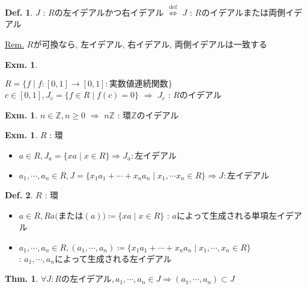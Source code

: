 \documentclass[uplatex,dvipdfmx,9pt]{beamer}
\newcommand{\defarrow}{\overset{\mathrm{def}}{\Leftrightarrow}}
\newcounter{textExmCount}
\theoremstyle{definition} %
\newtheorem{defn}{Def.}[subsection] %
\newtheorem{thm}{Thm.}[subsection] %
\theoremstyle{example}
\newtheorem{exmText}[textExmCount]{Exm.}
\begin{document}
    \begin{frame}

      \begin{defn}
        $J$ : $R$の左イデアルかつ右イデアル $\defarrow$ $J$ : $R$の\alert{イデアル}または\alert{両側イデアル}
      \end{defn}
      \underline{Rem.} $R$が可換なら, 左イデアル, 右イデアル, 両側イデアルは一致する
 
      \begin{exmText}
        \hypertarget{exmText3-1}{}
        $R = \{f \mid f\colon [0,1] \to [0,1] : \text{実数値連続関数}\}$ \\
        $c \in [0,1], J_c = \{f \in R \mid f(c) = 0\}$ $\Rightarrow$ $J_c$ : $R$のイデアル
      \end{exmText}

      \begin{exmText}
        $n \in \mathbb{Z}, n \ge 0$ $\Rightarrow$ $n\mathbb{Z}$ : 環$\mathbb{Z}$のイデアル
      \end{exmText}

    \end{frame}

    \begin{frame}

      \begin{exmText}
        $R$ : 環
        \begin{itemize}
          \item $a \in R, J_a = \{xa \mid x \in R\} \Rightarrow J_a : \text{左イデアル}$
          \item $a_1, \cdots, a_n \in R, J = \{x_1a_1 + \cdots + x_na_n \mid x_1, \cdots x_n \in R\} \Rightarrow J : \text{左イデアル}$
        \end{itemize}
      \end{exmText}

      \begin{defn}
        $R$ : 環
        \begin{itemize}
          \item $a \in R, Ra \text{(または$(a)$)} \coloneqq \{xa \mid x \in R\}$ : $a$によって\alert{生成}される\alert{単項左イデアル}
          \item $a_1, \cdots, a_n \in R, (a_1, \cdots, a_n) \coloneqq \{x_1a_1 + \cdots + x_na_n \mid x_1, \cdots, x_n \in R\}$ \\
                : $a_1, \cdots, a_n$によって\alert{生成}される左イデアル
        \end{itemize}
      \end{defn}

      \begin{thm}
        $\forall J : \text{$R$の左イデアル}, a_1, \cdots, a_n \in J \Rightarrow (a_1, \cdots, a_n) \subset J$
      \end{thm}

    \end{frame}
\end{document}

